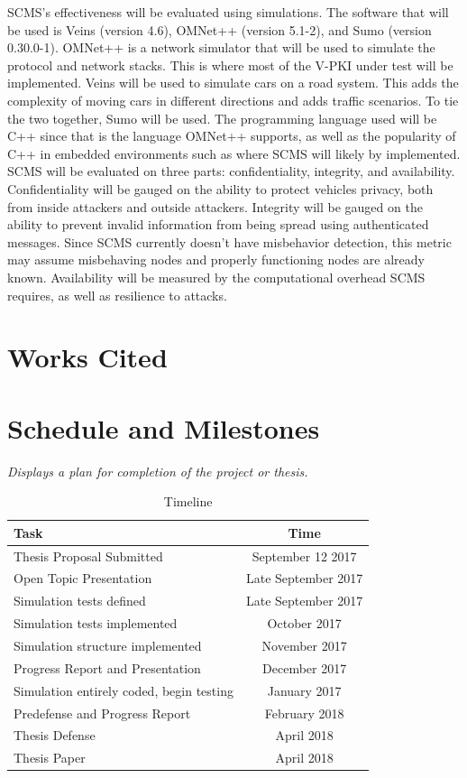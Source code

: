 \documentclass {article}
\newcommand{\sechint}[1]{\small{\emph{#1}} \bigskip}
\begin{document}
SCMS's effectiveness will be evaluated using simulations. The software that will be used is Veins (version 4.6), OMNet++ (version 5.1-2), and Sumo (version 0.30.0-1). OMNet++ is a network simulator that will be used to simulate the protocol and network stacks. This is where most of the V-PKI under test will be implemented. Veins will be used to simulate cars on a road system. This adds the complexity of moving cars in different directions and adds traffic scenarios. To tie the two together, Sumo will be used.
The programming language used will be C++ since that is the language OMNet++ supports, as well as the popularity of C++ in embedded environments such as where SCMS will likely by implemented. SCMS will be evaluated on three parts: confidentiality, integrity, and availability. Confidentiality will be gauged on the ability to protect vehicles privacy, both from inside attackers and outside attackers. Integrity will be gauged on the ability to prevent invalid information from being spread using authenticated messages. Since SCMS currently doesn't have misbehavior detection, this metric may assume misbehaving nodes and properly functioning nodes are already known. Availability will be measured by the computational overhead SCMS requires, as well as resilience to attacks.

\pagebreak
\section{Works Cited}
\printbibliography[title={\ }]

\pagebreak
\section{Schedule and Milestones}{\sechint{Displays a plan for completion of the project or thesis.}}

\begin{table}[!ht]
	\centering
	\begin{tabular}{l|c}
		Task & Time \\ \hline \hline
		Thesis Proposal Submitted & September 12 2017 \\ \hline
		Open Topic Presentation & Late September 2017 \\ \hline
		Simulation tests defined & Late September 2017 \\ \hline
		Simulation tests implemented & October 2017 \\ \hline
		Simulation structure implemented & November 2017 \\ \hline
		Progress Report and Presentation & December 2017 \\ \hline
		Simulation entirely coded, begin testing & January 2017 \\ \hline
		Predefense and Progress Report & February 2018 \\ \hline
		Thesis Defense & April 2018 \\ \hline
		Thesis Paper & April 2018 \\ \hline
	\end{tabular}
	\caption{Timeline}
\end{table}
\end{document}
